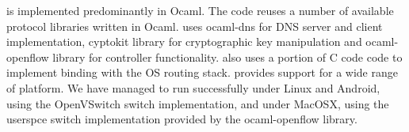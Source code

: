 \signpost is implemented predominantly in Ocaml. The code reuses a number of available
protocol libraries written in Ocaml. \signpost uses ocaml-dns for DNS server and
client implementation, cyptokit library for cryptographic key manipulation and
ocaml-openflow library for \of controller functionality. \signpost also uses a
portion of C code code to implement binding with the OS routing stack. \signpost
provides support for a wide range of platform. We have managed to run \signpost
successfully under Linux and Android,
using the OpenVSwitch switch implementation, and under MacOSX, using the userspce
switch implementation provided by the ocaml-openflow library.


